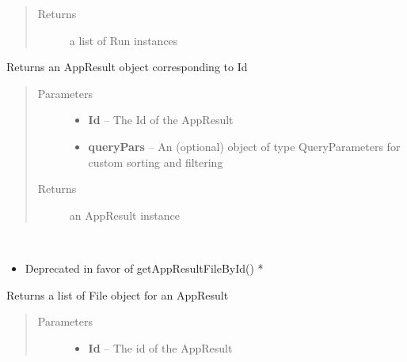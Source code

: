 \documentclass[letterpaper,10pt,english]{sphinxmanual}
\begin{document}
\begin{fulllineitems}
\begin{fulllineitems}
\begin{quote}
\begin{description}
\item[{Returns}] \leavevmode
a list of Run instances

\end{description}\end{quote}

\end{fulllineitems}


\begin{fulllineitems}
\label{Available modules:BaseSpacePy.api.BaseSpaceAPI.BaseSpaceAPI.getAppResultById}
Returns an AppResult object corresponding to Id
\begin{quote}\begin{description}
\item[{Parameters}] \leavevmode\begin{itemize}
\item {} 
\textbf{Id} -- The Id of the AppResult

\item {} 
\textbf{queryPars} -- An (optional) object of type QueryParameters for custom sorting and filtering

\end{itemize}

\item[{Returns}] \leavevmode
an AppResult instance

\end{description}\end{quote}

\end{fulllineitems}


\begin{fulllineitems}
\label{Available modules:BaseSpacePy.api.BaseSpaceAPI.BaseSpaceAPI.getAppResultFiles}~\begin{itemize}
\item {} 
Deprecated in favor of getAppResultFileById() *

\end{itemize}

Returns a list of File object for an AppResult
\begin{quote}\begin{description}
\item[{Parameters}] \leavevmode\begin{itemize}
\item {} 
\textbf{Id} -- The id of the AppResult


\end{itemize}
\end{description}
\end{quote}
\end{fulllineitems}
\end{fulllineitems}
\end{document}
